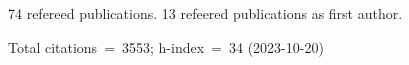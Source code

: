 74 refereed publications. 13 refeered publications as first author.

Total citations~=~3553; h-index~=~34 (2023-10-20)